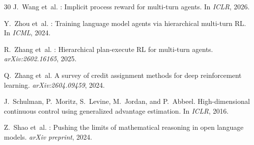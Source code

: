 \documentclass[10pt]{article}
\begin{document}
{\begin{thebibliography}{30}
J.~Wang et~al.
: Implicit process reward for multi-turn agents.
\newblock In \emph{ICLR}, 2026.

Y.~Zhou et~al.
: Training language model agents via hierarchical multi-turn RL.
\newblock In \emph{ICML}, 2024.

R.~Zhang et~al.
: Hierarchical plan-execute RL for multi-turn agents.
\newblock \emph{arXiv:2602.16165}, 2025.

Q.~Zhang et~al.
\newblock A survey of credit assignment methods for deep reinforcement learning.
\newblock \emph{arXiv:2604.09459}, 2024.

J.~Schulman, P.~Moritz, S.~Levine, M.~Jordan, and P.~Abbeel.
\newblock High-dimensional continuous control using generalized advantage estimation.
\newblock In \emph{ICLR}, 2016.

Z.~Shao et~al.
: Pushing the limits of mathematical reasoning in open language models.
\newblock \emph{arXiv preprint}, 2024.

\end{thebibliography}
}
\end{document}
